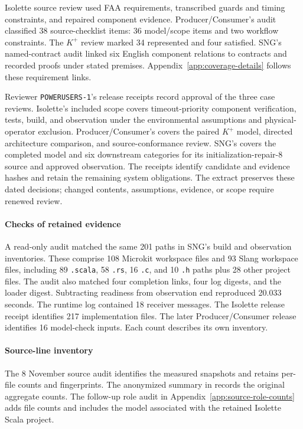 Isolette source review used FAA requirements, transcribed guards and timing constraints, and repaired component evidence. Producer/Consumer's audit classified 38 source-checklist items: 36 model/scope items and two workflow constraints. The $K^{+}$ review marked 34 represented and four satisfied. SNG's named-contract audit linked six English component relations to contracts and recorded proofs under stated premises. Appendix~\ref{app:coverage-details} follows these requirement links.

Reviewer \texttt{POWERUSERS-1}'s release receipts record approval of the three case reviews. Isolette's included scope covers timeout-priority component verification, tests, build, and observation under the environmental assumptions and physical-operator exclusion. Producer/\allowbreak{}Consumer's covers the paired $K^{+}$ model, directed architecture comparison, and source-conformance review. SNG's covers the completed model and six downstream categories for its initialization-repair-8 source and approved observation. The receipts identify candidate and evidence hashes and retain the remaining system obligations. The extract  preserves these dated decisions; changed contents, assumptions, evidence, or scope require renewed review.

\paragraph{Checks of retained evidence}
A read-only audit matched the same 201 paths in SNG's build and observation inventories. These comprise 108 Microkit workspace files and 93 Slang workspace files, including 89 \texttt{.scala}, 58 \texttt{.rs}, 16 \texttt{.c}, and 10 \texttt{.h} paths plus 28 other project files. The audit also matched four completion links, four log digests, and the loader digest. Subtracting readiness from observation end reproduced 20.033 seconds. The runtime log contained 18 receiver messages. The Isolette release receipt identifies 217 implementation files. The later Producer/Consumer release identifies 16 model-check inputs. Each count describes its own inventory.

\paragraph{Source-line inventory}
The 8 November source audit identifies the measured snapshots and retains per-file counts and fingerprints. The anonymized summary in  records the original aggregate counts. The follow-up role audit in Appendix~\ref{app:source-role-counts} adds file counts and includes the model associated with the retained Isolette Scala project.

